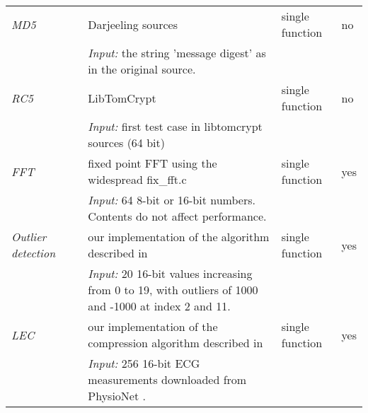 \begin{table}[h]
\begin{tabular}{llp{}ll}
\emph{MD5}               & \cite{Brouwers:2009cj, Ellul:2012thesis} & Darjeeling sources                                                                                         & single function  & no \\
                         &                                          & \emph{Input:} the string 'message digest' as in the original source.                                       &                  & \\ %

\emph{RC5}               &                                          & LibTomCrypt \cite{libtomcrypt}                                                                             & single function  & no \\
                         &                                          & \emph{Input:} first test case in libtomcrypt sources (64 bit)                                              &                  & \\

\emph{FFT}               & \cite{Kumar:2007ge}                      & fixed point FFT using the widespread fix\_fft.c \cite{sos-operating-system}                                & single function  & yes \\
                         &                                          & \emph{Input:} 64 8-bit or 16-bit numbers. Contents do not affect performance.                              &                  & \\

\emph{Outlier detection} & \cite{Kumar:2007ge}                      & our implementation of the algorithm described in \cite{Kumar:2007ge}                                       & single function  & yes \\
                         &                                          & \emph{Input:} 20 16-bit values increasing from 0 to 19, with outliers of 1000 and -1000 at index 2 and 11. &                  & \\

\emph{LEC}               &                                          & our implementation of the compression algorithm described in \cite{Marcelloni:2009ja}                      & single function  & yes \\
                         &                                          & \emph{Input:} 256 16-bit ECG measurements downloaded from PhysioNet \cite{physionet-ecg-data}.             &                  & \\


\end{tabular}
\end{table}
